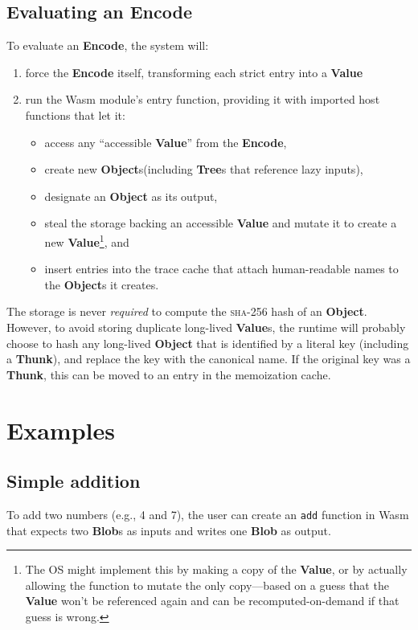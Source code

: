 \documentclass{article}
\newcommand{\blob}{\textbf{Blob}\xspace}
\newcommand{\blobs}{\textbf{Blob}s\xspace}
\newcommand{\valuex}{\textbf{Value}\xspace}
\newcommand{\valuexs}{\textbf{Value}s\xspace}
\newcommand{\object}{\textbf{Object}\xspace}
\newcommand{\objects}{\textbf{Object}s\xspace}
\newcommand{\encode}{\textbf{Encode}\xspace}
\newcommand{\thunk}{\textbf{Thunk}\xspace}
\newcommand{\trees}{\textbf{Tree}s\xspace}
\begin{document}
\subsection{Evaluating an \encode}

To evaluate an \encode, the system will:
\begin{enumerate}[itemsep=0pt]
\item force the \encode itself, transforming each strict entry into a \valuex
\item run the Wasm module's entry function, providing it with imported host functions that let it:
\begin{itemize}[itemsep=0pt, topsep=0pt]
\item access any ``accessible \valuex'' from the \encode,
\item create new \objects (including \trees that reference lazy inputs),
\item designate an \object as its output,
\item steal the storage backing an accessible \valuex and mutate it to create a new \valuex\footnote{The OS
might implement this by making a copy of the \valuex, or by actually allowing
the function to mutate the only copy---based on a guess that the \valuex won't be referenced
again and can be recomputed-on-demand if that guess is wrong.}, and
\item insert entries into the trace cache that attach human-readable names to the \objects it creates.
\end{itemize}
\end{enumerate}

The storage is never \emph{required} to compute the \textsc{sha-256} hash of an
\object. However, to avoid storing duplicate long-lived \valuexs, the
runtime will probably choose to hash any long-lived \object that is
identified by a literal key (including a \thunk), and replace the key
with the canonical name. If the original key was a \thunk, this can be
moved to an entry in the memoization cache.

\section{Examples}

\subsection{Simple addition} To add two numbers (e.g., 4 and
7), the user can create an \texttt{add} function in Wasm that expects
two \blobs as inputs and writes one \blob as output.
\end{document}
